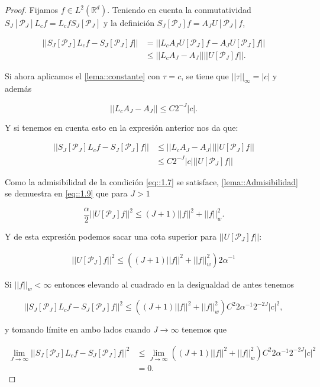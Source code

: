 \begin{proof}

\noindent Fijamos $f\in L^2(\mathbb{R}^d)$. Teniendo en cuenta la conmutatividad $S_J[\mathcal{P}_J] L_cf = L_cf S_J[\mathcal{P}_J]$ y la definición $S_J[\mathcal{P}_J]f=A_J U[\mathcal{P}_J]f$,

\begin{align*}
    ||S_J[\mathcal{P}_J] L_cf - S_J[\mathcal{P}_J]f || &= ||L_c A_J U[\mathcal{P}_J]f - A_J U[\mathcal{P}_J]f|| \\
    &\leq ||L_c A_J - A_J|| ||U[\mathcal{P}_J]f||.
\end{align*}

\medskip

\noindent Si ahora aplicamos el \autoref{lema::constante} con $\tau=c$, se tiene que $||\tau||_\infty=|c|$ y además

$$||L_c A_J - A_J|| \leq C 2^{-J} |c|.$$

\noindent Y si tenemos en cuenta esto en la expresión anterior nos da que: 

\begin{align*}
  ||S_J[\mathcal{P}_J] L_cf - S_J[\mathcal{P}_J]f || & \leq ||L_c A_J - A_J|| ||U[\mathcal{P}_J]f|| \\
  & \leq C 2^{-J} |c| ||U[\mathcal{P}_J]f||
\end{align*}

\noindent Como la admisibilidad de la condición \eqref{eq::1.7} se satisface, \autoref{lema::Admisibilidad} se demuestra en \eqref{eq::1.9} que para $J>1$

$$\frac{\alpha}{2}||U[\mathcal{P}_J]f||^2 \leq (J+1)||f||^2+||f||^2_w.$$

\noindent Y de esta expresión podemos sacar una cota superior para $||U[\mathcal{P}_J]f||$: 

\begin{align*}
  ||U[\mathcal{P}_J]f||^2 \leq ((J+1)||f||^2+||f||^2_w) 2 \alpha^{-1}
\end{align*}

\noindent Si $||f||_w < \infty$ entonces elevando al cuadrado en la desigualdad de antes tenemos

$$||S_J[\mathcal{P}_J] L_cf - S_J[\mathcal{P}_J]f ||^2 \leq ((J+1)||f||^2+||f||_w^2)C^2 2 \alpha^{-1} 2^{-2J} |c|^2,$$

\noindent y tomando límite en ambo lados cuando $J\rightarrow \infty$ tenemos que 

\begin{align*}
  \lim_{J\rightarrow \infty} ||S_J[\mathcal{P}_J] L_cf - S_J[\mathcal{P}_J]f ||^2 &\leq \lim_{J\rightarrow \infty} ((J+1)||f||^2+||f||_w^2)C^2 2 \alpha^{-1} 2^{-2J} |c|^2 \\
  &= 0.
\end{align*}


\end{proof}
